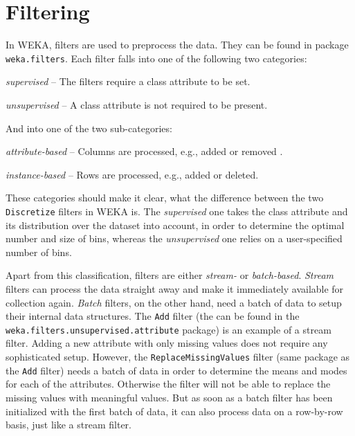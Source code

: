\section{Filtering}
In WEKA, filters are used to preprocess the data. They can be found in
package \texttt{weka.filters}. Each filter falls into one
of the following two categories:
\begin{tight_itemize}
	\item \textit{supervised} -- The filters require a class attribute to be
set.
	\item \textit{unsupervised} -- A class attribute is not required to be
present.
\end{tight_itemize}
And into one of the two sub-categories:
\begin{tight_itemize}
	\item \textit{attribute-based} -- Columns are processed, e.g., added or
removed .
	\item \textit{instance-based} -- Rows are processed, e.g., added or deleted.
\end{tight_itemize}
These categories should make it clear, what the difference between the two
\texttt{Discretize} filters in WEKA is. The \textit{supervised} one takes the
class attribute and its distribution over the dataset into account, in order to
determine the optimal number and size of bins, whereas the
\textit{unsupervised} one relies on a user-specified number of bins.

Apart from this classification, filters are either \textit{stream-} or
\textit{batch-based}. \textit{Stream} filters can process the data straight away
and make it immediately available for collection again. \textit{Batch} filters,
on the other hand, need a batch of data to setup their internal
data structures. The \texttt{Add} filter (the can be found in the
\texttt{weka.filters.unsupervised.attribute} package) is an example of a stream
filter. Adding a new attribute with only missing values does not require any
sophisticated setup. However, the \texttt{ReplaceMissingValues} filter (same
package as the \texttt{Add} filter) needs a batch of data in order to determine
the means and modes for each of the attributes. Otherwise the filter will not
be able to replace the missing values with meaningful values. But as soon as a
batch filter has been initialized with the first batch of data, it can also
process data on a row-by-row basis, just like a stream filter.

